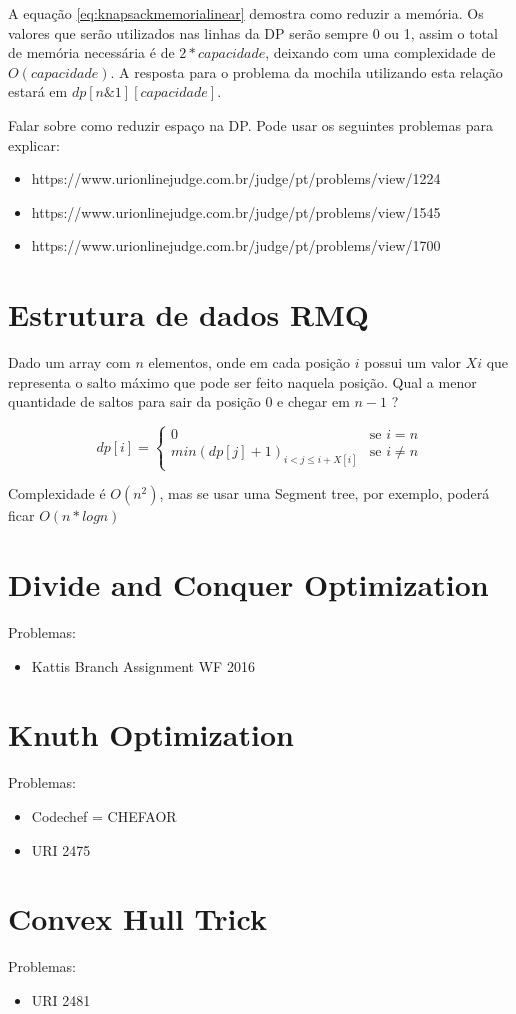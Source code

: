 A equação \ref{eq:knapsackmemorialinear} demostra como reduzir a memória. Os valores que serão utilizados nas linhas da DP serão sempre 0 ou 1, assim o total de memória necessária é de $2*capacidade$, deixando com uma complexidade de $O(capacidade)$. A resposta para o problema da mochila utilizando esta relação estará em $dp[n\&1][capacidade]$.

Falar sobre como reduzir espaço na DP.
Pode usar os seguintes problemas para explicar:
\begin{itemize}
	\item https://www.urionlinejudge.com.br/judge/pt/problems/view/1224
	\item https://www.urionlinejudge.com.br/judge/pt/problems/view/1545
	\item https://www.urionlinejudge.com.br/judge/pt/problems/view/1700
\end{itemize}

\section{Estrutura de dados RMQ}

Dado um array com $n$ elementos, onde em cada posição $i$ possui um valor $Xi$ que representa o salto máximo que pode ser feito naquela posição. Qual a menor quantidade de saltos para sair da posição 0 e chegar em $n-1$ ?

\begin{equation}
dp[i] = 
\begin{cases}
0 &\text{se } i = n \\
min(dp[j] + 1)_{i < j \leq i + X[i]} &\text{se } i \neq n

\end{cases}
\end{equation}

Complexidade é $O(n^2)$, mas se usar uma Segment tree, por exemplo, poderá ficar $O(n*logn)$

\section{Divide and Conquer Optimization}
Problemas:

\begin{itemize}
	\item Kattis Branch Assignment WF 2016
\end{itemize}

\section{Knuth Optimization}
Problemas:
\begin{itemize}
	\item Codechef = CHEFAOR
	\item URI 2475
\end{itemize}

\section{Convex Hull Trick}
Problemas:
\begin{itemize}
	\item URI 2481
\end{itemize}

